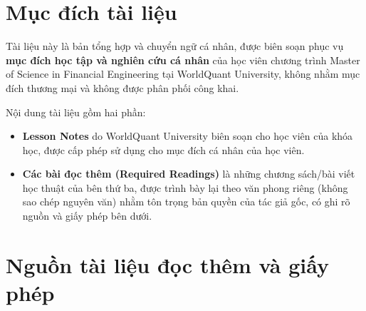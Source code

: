 

\thispagestyle{empty}

\section*{Mục đích tài liệu}

Tài liệu này là bản tổng hợp và chuyển ngữ cá nhân, được biên soạn phục vụ \textbf{mục đích học tập và nghiên cứu cá nhân} của học viên chương trình Master of Science in Financial Engineering tại WorldQuant University, không nhằm mục đích thương mại và không được phân phối công khai.

Nội dung tài liệu gồm hai phần:
\begin{itemize}
  \item \textbf{Lesson Notes} do WorldQuant University biên soạn cho học viên của khóa học, được cấp phép sử dụng cho mục đích cá nhân của học viên.
  \item \textbf{Các bài đọc thêm (Required Readings)} là những chương sách/bài viết học thuật của bên thứ ba, được trình bày lại theo văn phong riêng (không sao chép nguyên văn) nhằm tôn trọng bản quyền của tác giả gốc, có ghi rõ nguồn và giấy phép bên dưới.
\end{itemize}

\section*{Nguồn tài liệu đọc thêm và giấy phép}

